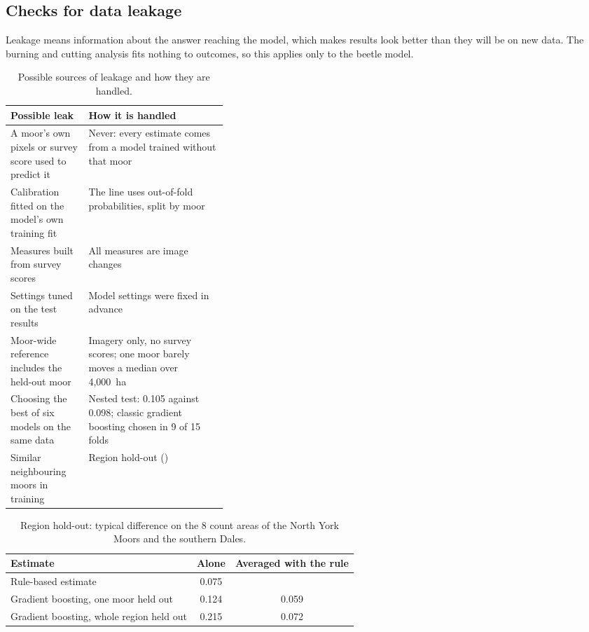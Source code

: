 \documentclass[11pt,a4paper]{article}
\begin{document}
\subsection{Checks for data leakage}\label{app:beetle-leakage}

Leakage means information about the answer reaching the model, which makes results look better than they will be on new data. The burning and cutting analysis fits nothing to outcomes, so this applies only to the beetle model.

\begin{table}[H]
\centering
\caption{Possible sources of leakage and how they are handled.}\label{tab:leakage}
\footnotesize
\begin{tabularx}{\linewidth}{>{\raggedright\arraybackslash}p{0.36\linewidth}L}
\toprule
Possible leak & How it is handled \\
\midrule
A moor's own pixels or survey score used to predict it & Never: every estimate comes from a model trained without that moor \\
Calibration fitted on the model's own training fit & The line uses out-of-fold probabilities, split by moor \\
Measures built from survey scores & All measures are image changes \\
Settings tuned on the test results & Model settings were fixed in advance \\
Moor-wide reference includes the held-out moor & Imagery only, no survey scores; one moor barely moves a median over 4,000~ha \\
Choosing the best of six models on the same data & Nested test: 0.105 against 0.098; classic gradient boosting chosen in 9 of 15 folds \\
Similar neighbouring moors in training & Region hold-out () \\
\bottomrule
\end{tabularx}
\end{table}

\begin{table}[H]
\centering
\caption{Region hold-out: typical difference on the 8 count areas of the North York Moors and the southern Dales.}\label{tab:region}
\small
\begin{tabular}{lcc}
\toprule
Estimate & Alone & Averaged with the rule \\
\midrule
Rule-based estimate & 0.075 & \\
Gradient boosting, one moor held out & 0.124 & 0.059 \\
Gradient boosting, whole region held out & 0.215 & 0.072 \\
\bottomrule
\end{tabular}
\end{table}
\end{document}
